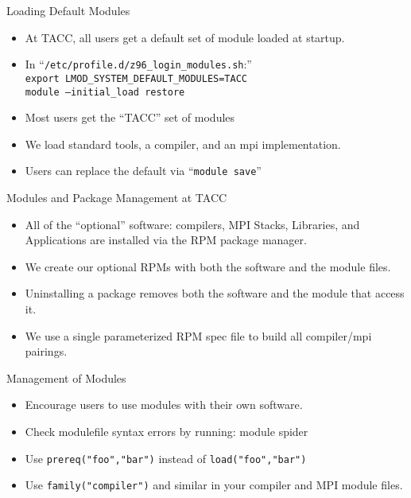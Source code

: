 \documentclass{beamer}
\begin{document}
\begin{frame}{Loading Default Modules}
  \begin{itemize}
    \item At TACC, all users get a default set of module loaded at startup.
    \item In ``\texttt{/etc/profile.d/z96\_login\_modules.sh}:'' \\
      {\color{blue}\texttt{export LMOD\_SYSTEM\_DEFAULT\_MODULES=TACC}}\\
      {\color{blue}\texttt{module --initial\_load restore}}
    \item Most users get the ``TACC'' set of modules
    \item We load standard tools, a compiler, and an mpi implementation.
    \item Users can replace the default via ``{\color{blue}\texttt{module save}}''
  \end{itemize}
\end{frame}

\begin{frame}{Modules and Package Management at TACC}
  \begin{itemize}
    \item All of the ``optional'' software: compilers, MPI Stacks,
      Libraries, and Applications are installed via the RPM package manager.
    \item We create our optional RPMs with both the software and the
      module files.
    \item Uninstalling a package removes both the software and the
      module that access it.
    \item We use a single parameterized RPM spec file to build all
      compiler/mpi pairings.
  \end{itemize}
\end{frame}

\begin{frame}{Management of Modules}
  \begin{itemize}
    \item Encourage users to use modules with their own software.
    \item Check modulefile syntax errors by running:
       {\color{blue}module spider}
    \item Use {\color{violet}\texttt{prereq("foo","bar")}} instead of
      {\color{violet}\texttt{load("foo","bar")}}
    \item Use  {\color{violet}\texttt{family("compiler")}} and similar
      in your compiler and MPI module files.
  \end{itemize}
\end{frame}
\end{document}
